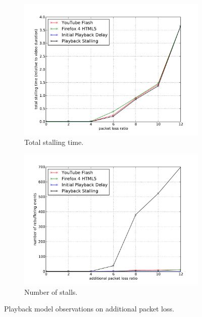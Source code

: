 \begin{figure}[htbp]
	\centering
    	\begin{subfigure}[b]{1.0\textwidth}
            \centering
            \includegraphics[width=\textwidth]{images/eval-loss4mb-stallingtime.pdf}
            \caption{Total stalling time.}
            \label{c3:fig:eval-loss-stallingtime}
        \end{subfigure}

    	\begin{subfigure}[b]{1.0\textwidth}
            \centering
            \includegraphics[width=\textwidth]{images/eval-loss4mb-frequency.pdf}
            \caption{Number of stalls.}
            \label{c3:fig:eval-loss-numstalls}
        \end{subfigure}
	\caption{Playback model observations on additional packet loss.}
	\label{c3:fig:eval-loss}
\end{figure}
 
